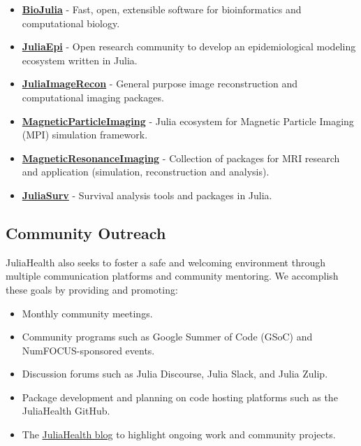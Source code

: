 \documentclass{juliacon}
\begin{document}
\begin{itemize}[label={\small\textbullet}, leftmargin=*, itemsep=4pt, labelsep=8pt]
    \item \href{https://github.com/BioJulia}{\textbf{BioJulia}} - Fast, open, extensible software for bioinformatics and computational biology.
    \item \href{https://github.com/JuliaEpi}{\textbf{JuliaEpi}} - Open research community to develop an epidemiological modeling ecosystem written in Julia.
    \item \href{https://github.com/JuliaImageRecon}{\textbf{JuliaImageRecon}} - General purpose image reconstruction and computational imaging packages.
    \item \href{https://github.com/MagneticParticleImaging}{\textbf{MagneticParticleImaging}} - Julia ecosystem for Magnetic Particle Imaging (MPI) simulation framework.
    \item \href{https://github.com/MagneticResonanceImaging}{\textbf{MagneticResonanceImaging}} - Collection of packages for MRI research and application (simulation, reconstruction and analysis).
    \item \href{https://github.com/JuliaSurv}{\textbf{JuliaSurv}} - Survival analysis tools and packages in Julia.
\end{itemize}


\subsection{Community Outreach}

JuliaHealth also seeks to foster a safe and welcoming environment through multiple communication platforms and community mentoring.
We accomplish these goals by providing and promoting:

\begin{itemize}[label={\small\textbullet}, leftmargin=*, itemsep=4pt, labelsep=8pt]
    \item Monthly community meetings.
    \item Community programs such as Google Summer of Code (GSoC) and NumFOCUS-sponsored events.
    \item Discussion forums such as Julia Discourse, Julia Slack, and Julia Zulip.
    \item Package development and planning on code hosting platforms such as the JuliaHealth GitHub.
    \item The \href{https://juliahealth.org/JuliaHealthBlog/}{JuliaHealth blog} to highlight ongoing work and community projects.
\end{itemize}
 
\end{document}
